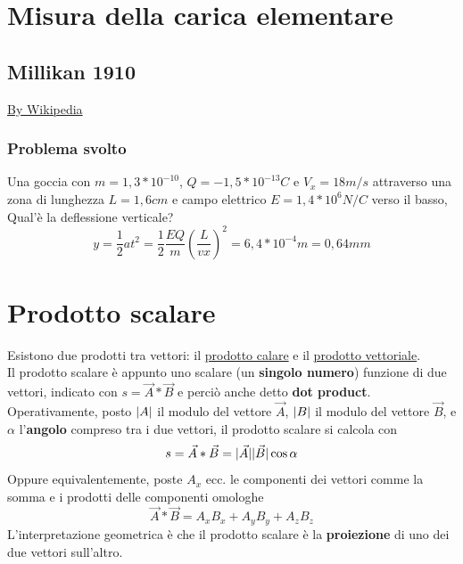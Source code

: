 \section{Misura della carica elementare}
\subsection{Millikan 1910}
\begin{center}
  \href{https://it.wikipedia.org/wiki/Esperimento_di_Millikan}{By Wikipedia}
\end{center}
\subsubsection{Problema svolto}
Una goccia con $m=1,3*10^{-10}$, $Q=-1,5*10^{-13}C$ e $V_x=18m/s$ attraverso una zona di lunghezza $L=1,6cm$ e campo elettrico $E=1,4*10^6N/C$ verso il basso,
Qual'è la deflessione verticale?
\begin{equation}
  y=\frac{1}{2}at^2=\frac{1}{2}\frac{EQ}{m}\left(\frac{L}{vx}\right)^2=6,4*10^{-4}m=0,64mm
\end{equation}
\section{Prodotto scalare}
Esistono due prodotti tra vettori: il \underline{prodotto calare} e il \underline{prodotto vettoriale}.\\
Il prodotto scalare è appunto uno scalare (un \textbf{singolo numero}) funzione di due vettori, indicato con
$s=\vec{A}*\vec{B}$ e perciò anche detto \textbf{dot product}. Operativamente, posto $\lvert A\rvert$ il modulo del vettore $\vec{A}$, $\lvert B\rvert$ il modulo del vettore $\vec{B}$, e $\alpha$ l'\textbf{angolo} compreso tra i due vettori, il prodotto scalare si calcola con
\begin{equation}
	s=\vec{A}*\vec{B}=\lvert\vec{A}\rvert\lvert\vec{B}\rvert\cos \alpha
\end{equation}
Oppure equivalentemente, poste $A_x$ ecc. le componenti dei vettori comme la somma e i prodotti delle componenti
omologhe
\begin{equation}
  \vec{A}*\vec{B}=A_xB_x+A_yB_y+A_zB_z
\end{equation}
L'interpretazione geometrica è che il prodotto scalare è la \textbf{proiezione} di uno dei due vettori
sull'altro.
